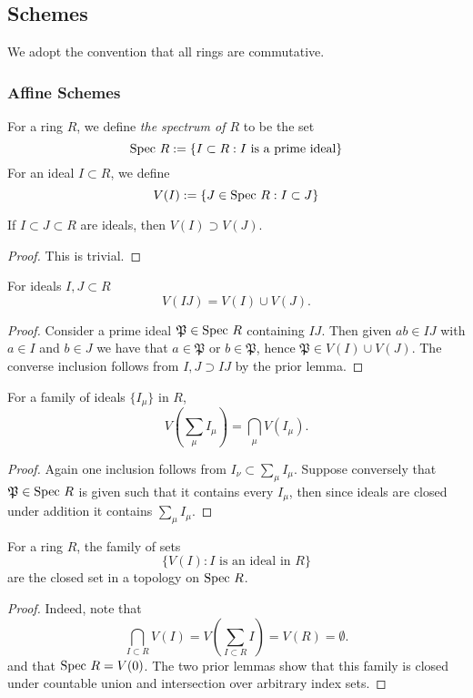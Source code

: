 \subsection{Schemes}
We adopt the convention that all rings are commutative.
\subsubsection{Affine Schemes}
\begin{definition}
    For a ring $R$, we define \emph{the spectrum of $R$} to be the set
    $$
        \mathrm{Spec}\ R := \{ I \subset R : I \text{ is a prime ideal}\}
    $$
    For an ideal $I\subset R$, we define 
    $$
        V(I) := \{ J\in \mathrm{Spec} \ R : I\subset J\}
    $$
\end{definition}
\begin{lemma}
    If $I\subset J\subset R$ are ideals, then $V(I)\supset V(J)$.
\end{lemma}
\begin{proof}
    This is trivial. 
\end{proof}
\begin{lemma}
    For ideals $I,J\subset R$
    $$V(IJ) = V(I)\cup V(J).$$
\end{lemma}
\begin{proof}
    Consider a prime ideal $\mathfrak{P}\in \mathrm{Spec} \ R$ containing $IJ$. Then given $ab\in IJ$ with $a\in I$ and $b\in J$ we have that $a \in \mathfrak{P}$ or $b\in \mathfrak{P}$, hence $\mathfrak{P}\in V(I)\cup V(J)$. The converse inclusion follows from $I,J\supset IJ$ by the prior lemma. 
\end{proof}
\begin{lemma}
    For a family of ideals $\{I_\mu\}$ in $R$, 
    $$V(\sum_\mu I_\mu) = \bigcap_\mu V(I_\mu).$$ 
\end{lemma}
\begin{proof}
    Again one inclusion follows from $I_\nu\subset \sum_\mu I_\mu$. Suppose conversely that $\mathfrak{P}\in \mathrm{Spec} \ R$ is given such that it contains every $I_\mu$, then since ideals are closed under addition it contains $\sum_\mu I_\mu$.  
\end{proof}
\begin{proposition}
    For a ring $R$, the family of sets 
    $$
        \{V(I) : I \text{ is an ideal in } R\}
    $$
    are the closed set in a topology on $\Spec \ R$. 
\end{proposition}
\begin{proof}
    Indeed, note that 
    $$\bigcap_{I\subset R} V(I) = V\left(\sum_{I\subset R} I\right)= V(R) = \emptyset.$$
    and that $\mathrm{Spec}\ R = V(0)$. The two prior lemmas show that this family is closed under countable union and intersection over arbitrary index sets. 
\end{proof}
